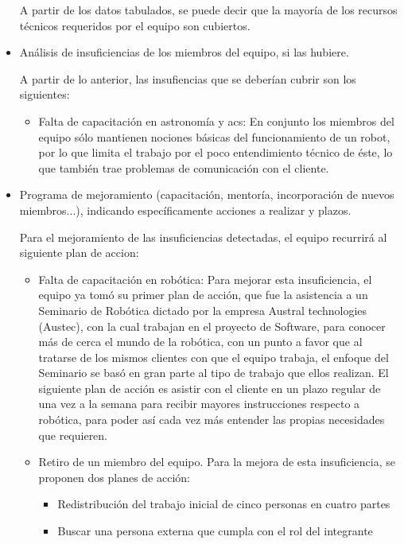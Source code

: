 \documentclass[letterpaper,spanish,10pt]{article}
\begin{document}
\begin{itemize}
\begin{description}
		\end{description}

A partir de los datos tabulados, se puede decir que la mayor\'ia de los recursos t\'ecnicos requeridos por el equipo son cubiertos. 


        \item An\'alisis de insuficiencias de los miembros del equipo, si las hubiere.




A partir de lo anterior, las insufiencias que se deber\'ian cubrir son los siguientes:

		\begin{itemize}
		\item{Falta de capacitaci\'on en astronom\'ia y acs:} En conjunto los miembros del equipo s\'olo mantienen nociones b\'asicas del funcionamiento de un robot, por lo que limita el trabajo por el poco entendimiento t\'ecnico de \'este, lo que tambi\'en trae problemas de comunicaci\'on con el cliente.
		\end{itemize}

        \item Programa de mejoramiento (capacitaci\'on, mentor\'ia, incorporaci\'on de nuevos miembros...), indicando espec\'ificamente acciones a realizar y plazos.

Para el mejoramiento de las insuficiencias detectadas, el equipo recurrir\'a al siguiente plan de accion:

		\begin{itemize}
		\item{Falta de capacitaci\'on en rob\'otica:} Para mejorar esta insuficiencia, el equipo ya tom\'o su primer plan de acci\'on, que fue la asistencia a un Seminario de Rob\'otica dictado por la empresa Austral technologies (Austec), con la cual trabajan en el proyecto de Software, para conocer m\'as de cerca el mundo de la rob\'otica, con un punto a favor que al tratarse de los mismos clientes con que el equipo trabaja, el enfoque del Seminario se bas\'o en gran parte al tipo de trabajo que ellos realizan. El siguiente plan de acci\'on es asistir con el cliente en un plazo regular de una vez a la semana para recibir mayores instrucciones respecto a rob\'otica, para poder as\'i cada vez m\'as entender las propias necesidades que requieren.
		\item{Retiro de un miembro del equipo.} Para la mejora de esta insuficiencia, se proponen dos planes de acci\'on:
			\begin{itemize}
			\item{Redistribuci\'on del trabajo inicial de cinco personas en cuatro partes}
			\item{Buscar una persona externa que cumpla con el rol del integrante}
			\end{itemize}


\end{itemize}
\end{itemize}
\end{document}
